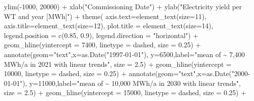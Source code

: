 \documentclass[a4paper,11pt]{article}
\newenvironment{Shaded}{\begin{snugshade}}{\end{snugshade}}
\newcommand{\AttributeTok}[1]{\textcolor[rgb]{0.77,0.63,0.00}{#1}}
\newcommand{\DecValTok}[1]{\textcolor[rgb]{0.00,0.00,0.81}{#1}}
\newcommand{\FloatTok}[1]{\textcolor[rgb]{0.00,0.00,0.81}{#1}}
\newcommand{\FunctionTok}[1]{\textcolor[rgb]{0.00,0.00,0.00}{#1}}
\newcommand{\NormalTok}[1]{#1}
\newcommand{\SpecialCharTok}[1]{\textcolor[rgb]{0.00,0.00,0.00}{#1}}
\newcommand{\StringTok}[1]{\textcolor[rgb]{0.31,0.60,0.02}{#1}}
\begin{document}
\begin{Shaded}
\begin{Highlighting}[]
  \FunctionTok{ylim}\NormalTok{(}\SpecialCharTok{{-}}\DecValTok{1000}\NormalTok{, }\DecValTok{20000}\NormalTok{) }\SpecialCharTok{+}
  \FunctionTok{xlab}\NormalTok{(}\StringTok{"Commissioning Date"}\NormalTok{) }\SpecialCharTok{+}
  \FunctionTok{ylab}\NormalTok{(}\StringTok{"Electricity yield per WT and year [MWh]"}\NormalTok{) }\SpecialCharTok{+}
  \FunctionTok{theme}\NormalTok{( }\AttributeTok{axis.text=}\FunctionTok{element\_text}\NormalTok{(}\AttributeTok{size=}\DecValTok{11}\NormalTok{),}
         \AttributeTok{axis.title=}\FunctionTok{element\_text}\NormalTok{(}\AttributeTok{size=}\DecValTok{12}\NormalTok{),}
         \AttributeTok{plot.title =} \FunctionTok{element\_text}\NormalTok{(}\AttributeTok{size=}\DecValTok{14}\NormalTok{),}
         \AttributeTok{legend.position =} \FunctionTok{c}\NormalTok{(}\FloatTok{0.85}\NormalTok{, }\FloatTok{0.9}\NormalTok{),}
         \AttributeTok{legend.direction =} \StringTok{"horizontal"}\NormalTok{) }\SpecialCharTok{+}
  \FunctionTok{geom\_hline}\NormalTok{(}\AttributeTok{yintercept =} \DecValTok{7400}\NormalTok{, }\AttributeTok{linetype =} \StringTok{\textquotesingle{}dashed\textquotesingle{}}\NormalTok{, }\AttributeTok{size =} \FloatTok{0.25}\NormalTok{) }\SpecialCharTok{+}
  \FunctionTok{annotate}\NormalTok{(}\AttributeTok{geom=}\StringTok{"text"}\NormalTok{,}\AttributeTok{x=}\FunctionTok{as.Date}\NormalTok{(}\StringTok{"1997{-}01{-}01"}\NormalTok{),}
           \AttributeTok{y=}\DecValTok{6500}\NormalTok{,}\AttributeTok{label=}\StringTok{"mean of \textasciitilde{} 7,400 MWh/a in 2021 with linear trends"}\NormalTok{,}
           \AttributeTok{size =} \FloatTok{2.5}\NormalTok{) }\SpecialCharTok{+}
  \FunctionTok{geom\_hline}\NormalTok{(}\AttributeTok{yintercept =} \DecValTok{10000}\NormalTok{, }\AttributeTok{linetype =} \StringTok{\textquotesingle{}dashed\textquotesingle{}}\NormalTok{, }\AttributeTok{size =} \FloatTok{0.25}\NormalTok{) }\SpecialCharTok{+}
  \FunctionTok{annotate}\NormalTok{(}\AttributeTok{geom=}\StringTok{"text"}\NormalTok{,}\AttributeTok{x=}\FunctionTok{as.Date}\NormalTok{(}\StringTok{"2000{-}01{-}01"}\NormalTok{),}
           \AttributeTok{y=}\DecValTok{11000}\NormalTok{,}\AttributeTok{label=}\StringTok{"mean of \textasciitilde{} 10,000 MWh/a in 2030 with linear trends"}\NormalTok{, }
           \AttributeTok{size =} \FloatTok{2.5}\NormalTok{) }\SpecialCharTok{+}
  \FunctionTok{geom\_hline}\NormalTok{(}\AttributeTok{yintercept =} \DecValTok{15000}\NormalTok{, }\AttributeTok{linetype =} \StringTok{\textquotesingle{}dashed\textquotesingle{}}\NormalTok{, }\AttributeTok{size =} \FloatTok{0.25}\NormalTok{) }\SpecialCharTok{+}

\end{Highlighting}
\end{Shaded}
\end{document}
